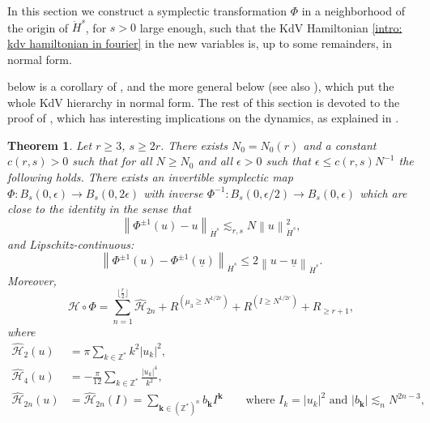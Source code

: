 \documentclass[a4paper,10pt,reqno]{article}
\theoremstyle{definition}
\theoremstyle{plain}
\newtheorem{theorem}[definition]{Theorem}
\theoremstyle{plain}
\theoremstyle{definition}
\theoremstyle{plain}
\theoremstyle{plain}
\theoremstyle{plain}
\theoremstyle{definition}
\theoremstyle{definition}
\newcommand{\norm}[1]{\left\lVert #1 \right\rVert}
\def \Z{\mathbb Z}
\def \H{\mathcal{H}}
\def \k{\bm{k}}
\begin{document}
In this section we construct a symplectic transformation $\Phi$ in a neighborhood of the origin of $\dot{H}^s$, for $s>0$ large enough, such that the KdV Hamiltonian \eqref{intro: kdv hamiltonian in fourier}  in the new variables is, up to some remainders, in normal form. 

 below is a corollary of ,  and the more general  below (see also ), which put the whole KdV hierarchy in normal form. 
The rest of this section is devoted to the proof of , which has interesting implications on the dynamics, as explained in .

\begin{theorem} \label{thm: normal form for ham}
Let $r \ge 3$, $s \ge 2r$. There exists $N_0=N_0(r)$ and a constant $c(r,s)>0$ such that for all $N\geq N_0$ and all $\epsilon>0$ such that $\epsilon\leq c(r,s) N^{-1}$ the following holds.
There exists an invertible symplectic map $\Phi : B_s(0,\epsilon) \rightarrow B_s(0,2\epsilon)$ with inverse $\Phi^{-1} : B_s(0,\epsilon/2) \rightarrow B_s(0,\epsilon)$
which are close to the identity in the sense that
\begin{equation}
\norm{\Phi^{\pm 1}(u)-u}_{\dot{H}^s} \lesssim_{r,s} N \norm{u}_{\dot{H}^s}^2,
\label{eq: close to the identity - thm ham}
\end{equation}
and Lipschitz-continuous:
\begin{equation} \label{eq: lipschitzianity}
\norm{\Phi^{\pm 1}(u) - \Phi^{\pm 1}(\underline{u})}_{\dot{H}^s} \le 2 \norm{u-\underline{u}}_{\dot{H}^s}.
\end{equation}
Moreover, 
\begin{equation}
\H \circ \Phi = \sum_{n = 1}^{\lfloor \frac{r}{2} \rfloor } \widehat{\H}_{2n} + R^{(\mu_3 \ge N^{1/2r})} + R^{(I \ge N^{1/2r})} + R_{\ge r+1},
\label{hamiltoniana dopo tutte le trasformazioni - thm ham}
\end{equation}
where
\begin{align}
\widehat{\H}_2(u) &= \pi \sum_{k \in \Z^*} k^{2} |u_k|^2, \label{parte quadratica thm ham}\\
\widehat{\H}_4(u) &= -\frac{\pi}{12} \sum_{k \in \Z^*} \frac{|u_k|^4}{k^2}, \label{parte quartica - thm ham} \\
\widehat{\H}_{2n}(u) &= \widehat{\H}_{2n}(I) = \sum_{\k \in (\Z^*)^n} b_{\k} I^{\k} \qquad \text{where $I_k = |u_k|^2$ and $|b_{\k}| \lesssim_n N^{2n-3}$}, \label{parte integrabile 2 - thm ham} \\

\end{align}
\end{theorem}
\end{document}
